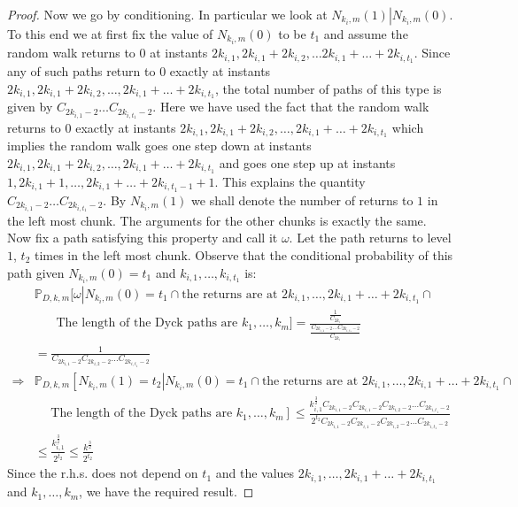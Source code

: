 \documentclass[12pt]{article}
\numberwithin{equation}{section}
\numberwithin{equation}{section}
\theoremstyle{definition}
\renewcommand{\1}{\bf 1}
\begin{document}
\begin{proof}
Now we go by conditioning. In particular we look at $N_{k_{i},m}(1)\left|N_{k_{i},m}(0) \right.$.
To this end we at first fix the value of $N_{k_{i},m}(0)$ to be $t_{1}$ and assume the random walk returns to $0$ at instants $2k_{i,1},2k_{i,1}+2k_{i,2},\ldots 2k_{i,1}+\ldots+2k_{i,t_{1}}$. Since any of such paths return to $0$ exactly at instants $2k_{i,1},2k_{i,1}+2k_{i,2},\ldots, 2k_{i,1}+\ldots+2k_{i,t_{1}}$, the total number of paths of this type is given by $C_{2k_{i,1}-2}\ldots C_{2k_{i,t_{1}}-2}$. Here we have used the fact that the random walk returns to $0$ exactly at instants $2k_{i,1},2k_{i,1}+2k_{i,2},\ldots, 2k_{i,1}+\ldots+2k_{i,t_{1}}$ which implies the random walk goes one step down at instants $2k_{i,1},2k_{i,1}+2k_{i,2},\ldots, 2k_{i,1}+\ldots+2k_{i,t_{1}}$ and goes one step up at instants $1,2k_{i,1}+1, \ldots, 2k_{i,1}+\ldots +2k_{i,t_{1}-1}+1$. This explains the quantity $C_{2k_{i,1}-2}\ldots C_{2k_{i,t_{1}}-2}$. By $N_{k_{i},m}(1)$ we shall denote the number of returns to $1$ in the left most chunk. The arguments for the other chunks is exactly the same. Now fix a path satisfying this property and call it $\omega$. Let the path returns to level $1$, $t_{2}$ times in the left most chunk. Observe that the conditional probability of this path given $N_{k_{i},m}(0)=t_{1}$ and $k_{i,1},\ldots,k_{i,t_{1}}$ is:
\begin{equation}
\begin{split}
&\mathbb{P}_{D,k,m}[\omega \left| N_{k_{i},m}(0)=t_{1} \cap \text{the returns are at $2k_{i,1},\ldots , 2k_{i,1}+\ldots + 2k_{i,t_{1}} $} \cap \right.\\
&~~~~~~~~\left. \text{The length of the Dyck paths are } k_{1},\ldots, k_{m} \right.]= \frac{\frac{1}{C_{2k_{i}}}}{\frac{C_{2k_{i,1}-2}\ldots C_{2k_{i,t_{1}}-2}}{C_{2k_{i}}}}\\
&=\frac{1}{C_{2k_{i,1}-2}C_{2k_{i,2}-2}\ldots C_{2k_{i,t_{1}}-2}}\\
 \Rightarrow & \mathbb{P}_{D,k,m} \left[ N_{k_{i},m}(1)= t_{2}\left| N_{k_{i},m}(0)=t_{1} \cap \text{the returns are at $2k_{i,1},\ldots , 2k_{i,1}+\ldots + 2k_{i,t_{1}} $} \cap \right. \right.\\
& ~~~~~~\left. \text{The length of the Dyck paths are } k_{1},\ldots, k_{m}  \right]\le \frac{k_{i,1}^{\frac{3}{2}}C_{2k_{i,1}-2}C_{2k_{i,1}-2}C_{2k_{i,2}-2}\ldots C_{2k_{i,t_{1}}-2}}{2^{t_{2}}C_{2k_{i,1}-2}C_{2k_{i,1}-2}C_{2k_{i,2}-2}\ldots C_{2k_{i,t_{1}}-2}}\\
&\le \frac{k_{i,1}^{\frac{3}{2}}}{2^{t_{2}}} \le \frac{k^{\frac{3}{2}}}{2^{t_{2}}}
\end{split}
\end{equation} 
Since the r.h.s. does not depend on $t_{1}$ and the values $2k_{i,1},\ldots , 2k_{i,1}+\ldots + 2k_{i,t_{1}} $ and $k_{1},\ldots, k_{m} $, we have the required result.


\end{proof}
\end{document}
